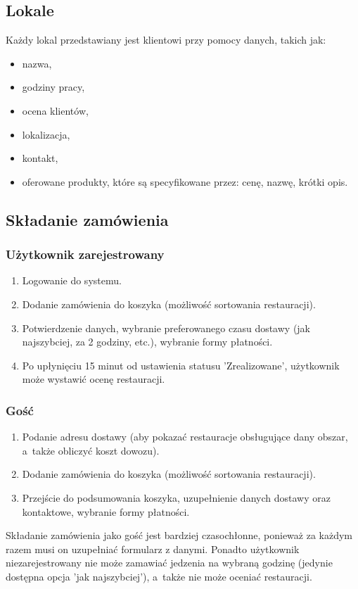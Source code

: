 \documentclass[12pt, a4paper, oneside]{article}
\begin{document}
\subsection{Lokale}
\indent\indent Każdy lokal przedstawiany jest klientowi przy pomocy danych, takich jak:
\begin{itemize}
\item nazwa,
\item godziny pracy,
\item ocena klientów,
\item lokalizacja,
\item kontakt,
\item oferowane produkty, które są specyfikowane przez: cenę, nazwę, krótki opis.
\end{itemize}
\subsection{Składanie zamówienia}
\subsubsection{Użytkownik zarejestrowany}
\begin{enumerate}
\item Logowanie do systemu.
\item Dodanie zamówienia do koszyka (możliwość sortowania restauracji).
\item Potwierdzenie danych, wybranie preferowanego czasu dostawy (jak najszybciej, za 2 godziny, etc.), wybranie formy płatności.
\item Po upłynięciu 15 minut od ustawienia statusu 'Zrealizowane', użytkownik może wystawić ocenę restauracji.
\end{enumerate}

\subsubsection{Gość}
\begin{enumerate}
\item Podanie adresu dostawy (aby pokazać restauracje obsługujące dany obszar, a~także obliczyć koszt dowozu).
\item Dodanie zamówienia do koszyka (możliwość sortowania restauracji).
\item Przejście do podsumowania koszyka, uzupełnienie danych dostawy oraz kontaktowe, wybranie formy płatności.
\end{enumerate}
\indent\indent Składanie zamówienia jako gość jest bardziej czasochłonne, ponieważ za każdym razem musi on uzupełniać formularz z danymi. Ponadto użytkownik niezarejestrowany nie może zamawiać jedzenia na wybraną godzinę (jedynie dostępna opcja 'jak najszybciej'), a~także nie może oceniać restauracji.
\end{document}
